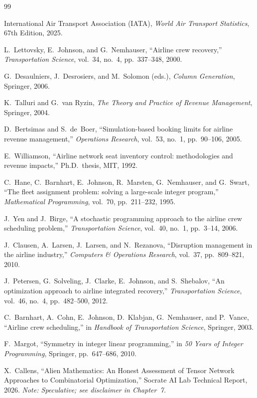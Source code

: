 \documentclass[11pt,a4paper]{book}
\theoremstyle{definition}
\begin{document}
\begin{thebibliography}{99}

International Air Transport Association (IATA),
\textit{World Air Transport Statistics}, 67th Edition, 2025.

L.~Lettovsky, E.~Johnson, and G.~Nemhauser,
``Airline crew recovery,''
\textit{Transportation Science}, vol.~34, no.~4, pp.~337--348, 2000.

G.~Desaulniers, J.~Desrosiers, and M.~Solomon (eds.),
\textit{Column Generation},
Springer, 2006.

K.~Talluri and G.~van Ryzin,
\textit{The Theory and Practice of Revenue Management},
Springer, 2004.

D.~Bertsimas and S.~de~Boer,
``Simulation-based booking limits for airline revenue management,''
\textit{Operations Research}, vol.~53, no.~1, pp.~90--106, 2005.

E.~Williamson,
``Airline network seat inventory control: methodologies and revenue impacts,''
Ph.D.\ thesis, MIT, 1992.

C.~Hane, C.~Barnhart, E.~Johnson, R.~Marsten, G.~Nemhauser, and G.~Swart,
``The fleet assignment problem: solving a large-scale integer program,''
\textit{Mathematical Programming}, vol.~70, pp.~211--232, 1995.

J.~Yen and J.~Birge,
``A stochastic programming approach to the airline crew scheduling problem,''
\textit{Transportation Science}, vol.~40, no.~1, pp.~3--14, 2006.

J.~Clausen, A.~Larsen, J.~Larsen, and N.~Rezanova,
``Disruption management in the airline industry,''
\textit{Computers \& Operations Research}, vol.~37, pp.~809--821, 2010.

J.~Petersen, G.~Solveling, J.~Clarke, E.~Johnson, and S.~Shebalov,
``An optimization approach to airline integrated recovery,''
\textit{Transportation Science}, vol.~46, no.~4, pp.~482--500, 2012.

C.~Barnhart, A.~Cohn, E.~Johnson, D.~Klabjan, G.~Nemhauser, and P.~Vance,
``Airline crew scheduling,''
in \textit{Handbook of Transportation Science}, Springer, 2003.

F.~Margot,
``Symmetry in integer linear programming,''
in \textit{50 Years of Integer Programming}, Springer, pp.~647--686, 2010.

X.~Callens,
``Alien Mathematics: An Honest Assessment of Tensor Network Approaches
to Combinatorial Optimization,''
Socrate AI Lab Technical Report, 2026.
\textit{Note: Speculative; see disclaimer in Chapter~7.}

\end{thebibliography}
\end{document}
